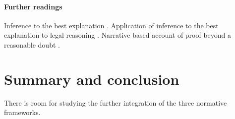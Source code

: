 \documentclass[10pt]{article}
\begin{document}
\paragraph{Further readings}

Inference to the best explanation \citep{lipton1991}.
Application of inference to the best explanation 
to legal reasoning \citep{pardoAllen2008}. 
Narrative based account of proof beyond a 
reasonable doubt \citep{allen2010, allenStein2013}.
















\section{Summary and conclusion}



There is room for studying the further integration of the three normative frameworks.







%
	
%

\end{document}
